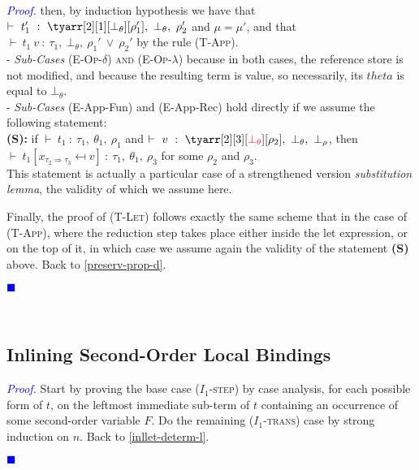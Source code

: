 \documentclass[a4paper,11pt,oneside]{article}
\theoremstyle{plain}
\newtheorem{lemma}[definition]{Lemma}
\renewenvironment{proof}{\noindent \textcolor{blue}{\textit{Proof.}}}
{{\begin{tiny}\textcolor{blue}{$\blacksquare$}\end{tiny}}\\}
\newcommand{\bwedge}{\boldsymbol{~\wedge~}}
\newcommand{\bvee}{\boldsymbol{~\vee~}}
\newcommand{\brarr}{\boldsymbol{~\Rightarrow~}}
\newcommand{\typing}[4]{\vdash~#1~:~#2,~#3,~#4}
\newcommand{\bth}{\bot_\theta}
\newcommand{\brh}{\bot_\rho}
\newcommand{\hookdownarrow}{\mathrel{\rotatebox[origin=c]{180}{$\hookleftarrow$}}}
\newcommand{\inlletarr}{\hookdownarrow}
\newcommand{\inlletstar}{\hookdownarrow^{\star}}
\newcommand{\inlletplus}{\inlletstar}
\begin{document}
\begin{proof}
then, by induction hypothesis we have that $\typing{t'_1}{\tyarr[2][1][\bth][\rho_1']}{\bth}{\rho_2'}$ and $\mu = \mu'$, and that $\typing{t_1~v}{\tau_1}{\bth}{\rho_1' \bvee \rho_2'}$ by the rule \textsc{(T-App)}. \\

- \textit{Sub-Cases}	\textsc{(E-Op-$\delta$) and (E-Op-$\lambda$)} because in both cases, the reference store is not modified, and because the resulting term is value, so necessarily, its $theta$ is equal to $\bth$. \\
		
- \textit{Sub-Cases} (E-App-Fun) and  (E-App-Rec) hold directly if we assume the following statement: \\
\label{subst-lemma}
\textbf{(S):} if $\typing{t_1}{\tau_1}{\theta_1}{\rho_1}$ and $\typing{v}{\tyarr[2][3][\textcolor{red}{\bth}][\textcolor{black}{\rho_2}]}{\bth}{\brh}$, then $\typing{t_1[x_{\tau_2 \Rightarrow \tau_3} \mapsfrom v]}{\tau_1}{\theta_1}{\rho_3}$ for some $\rho_2$ and $\rho_3$. \\

This statement is actually a particular case of a strengthened version \textit{substitution lemma}, the validity of which we assume here. 

Finally, the proof of \textsc{(T-Let)} follows exactly the same scheme that in the case of \textsc{(T-App)}, where the reduction step takes place either inside the let expression, or on the top of it, in which case we assume again the validity of the statement \textbf{(S)} above. Back to \ref{preserv-prop-d}.
\end{proof}  	

	\subsection{Inlining Second-Order Local Bindings}
	


\begin{proof}
Start by proving the base case (\textsc{$I_1$-step}) by case analysis, for each possible form of $t$, on the leftmost immediate sub-term of $t$ containing an occurrence of some second-order variable $F$. 
	  Do the remaining  (\textsc{$I_1$-trans}) case	by strong induction on $n$.  Back to \ref{inllet-determ-l}.
\end{proof}	
	
\end{document}

